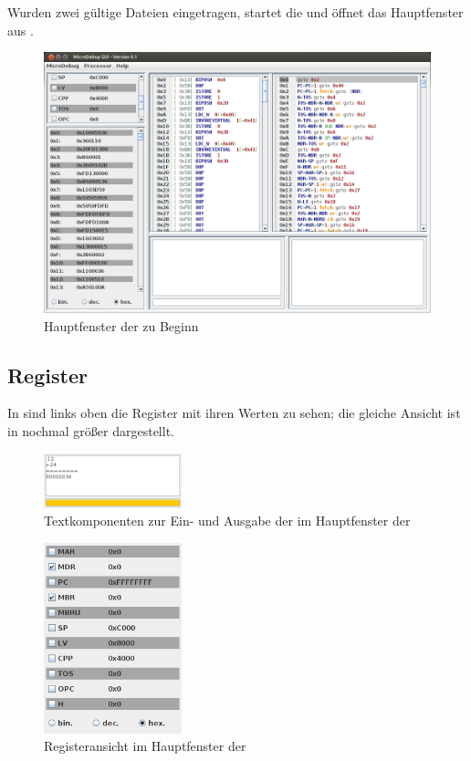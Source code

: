 Wurden zwei gültige Dateien eingetragen, startet die \mdg und öffnet das Hauptfenster aus .

\begin{figure}[h]
	\centering
	\includegraphics[width=0.8\linewidth]{images/main-frame-onbegin}
	\caption{Hauptfenster der \mdg zu Beginn}
\end{figure}

\subsection{Register}
In  sind links oben die Register mit ihren Werten zu sehen; die gleiche Ansicht ist in  nochmal größer dargestellt.

\begin{figure}[h]
	\centering
	\includegraphics[width=4cm]{images/main-frame-mic-ta}
	\caption{Textkomponenten zur Ein- und Ausgabe der \mic im Hauptfenster der \mdg}
\end{figure}

\begin{figure}[h]
	\centering
	\includegraphics[width=4cm]{images/main-frame-registers}
	\caption{Registeransicht im Hauptfenster der \mdg}
\end{figure}

